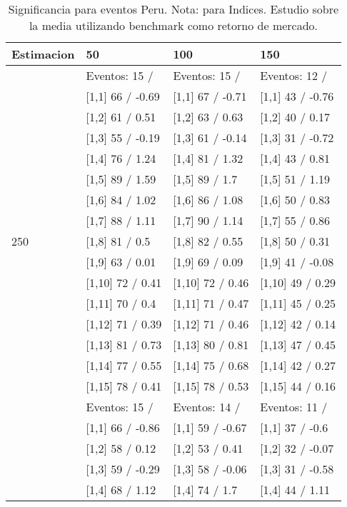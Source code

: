 \begin{table}

\caption{Significancia para eventos Peru. Nota: para Indices. Estudio sobre la media utilizando benchmark como retorno de mercado.}
\centering
\begin{tabular}[t]{llll}
\toprule
Estimacion & 50 & 100 & 150\\
\midrule
 & Eventos:  15 / & Eventos:  15 / & Eventos:  12 /\\
 & {}[1,1] 66  / -0.69 & {}[1,1] 67  / -0.71 & {}[1,1] 43  / -0.76\\
 & {}[1,2] 61  / 0.51 & {}[1,2] 63  / 0.63 & {}[1,2] 40  / 0.17\\
 & {}[1,3] 55  / -0.19 & {}[1,3] 61  / -0.14 & {}[1,3] 31  / -0.72\\
 & {}[1,4] 76  / 1.24 & {}[1,4] 81  / 1.32 & {}[1,4] 43  / 0.81\\
\addlinespace
 & {}[1,5] 89  / 1.59 & {}[1,5] 89  / 1.7 & {}[1,5] 51  / 1.19\\
 & {}[1,6] 84  / 1.02 & {}[1,6] 86  / 1.08 & {}[1,6] 50  / 0.83\\
 & {}[1,7] 88  / 1.11 & {}[1,7] 90  / 1.14 & {}[1,7] 55  / 0.86\\
250 & {}[1,8] 81  / 0.5 & {}[1,8] 82  / 0.55 & {}[1,8] 50  / 0.31\\
 & {}[1,9] 63  / 0.01 & {}[1,9] 69  / 0.09 & {}[1,9] 41  / -0.08\\
\addlinespace
 & {}[1,10] 72  / 0.41 & {}[1,10] 72  / 0.46 & {}[1,10] 49  / 0.29\\
 & {}[1,11] 70  / 0.4 & {}[1,11] 71  / 0.47 & {}[1,11] 45  / 0.25\\
 & {}[1,12] 71  / 0.39 & {}[1,12] 71  / 0.46 & {}[1,12] 42  / 0.14\\
 & {}[1,13] 81  / 0.73 & {}[1,13] 80  / 0.81 & {}[1,13] 47  / 0.45\\
 & {}[1,14] 77  / 0.55 & {}[1,14] 75  / 0.68 & {}[1,14] 42  / 0.27\\
\addlinespace
 & {}[1,15] 78  / 0.41 & {}[1,15] 78  / 0.53 & {}[1,15] 44  / 0.16\\
 & Eventos:  15 / & Eventos:  14 / & Eventos:  11 /\\
 & {}[1,1] 66  / -0.86 & {}[1,1] 59  / -0.67 & {}[1,1] 37  / -0.6\\
 & {}[1,2] 58  / 0.12 & {}[1,2] 53  / 0.41 & {}[1,2] 32  / -0.07\\
 & {}[1,3] 59  / -0.29 & {}[1,3] 58  / -0.06 & {}[1,3] 31  / -0.58\\
\addlinespace
 & {}[1,4] 68  / 1.12 & {}[1,4] 74  / 1.7 & {}[1,4] 44  / 1.11\\

\end{tabular}
\end{table}
